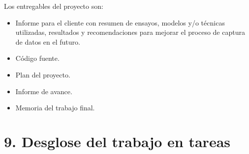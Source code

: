 \documentclass[
11pt, %
]{charter}
\begin{document}
Los entregables del proyecto son:

\begin{itemize}
	\item Informe para el cliente con resumen de ensayos, modelos y/o técnicas utilizadas, resultados	y recomendaciones para mejorar el proceso de captura de datos en el futuro.
	\item Código fuente.
	\item Plan del proyecto.
	\item Informe de avance.
	\item Memoria del trabajo final.

\end{itemize}


\section{9. Desglose del trabajo en tareas}
\label{sec:wbs}
\end{document}
